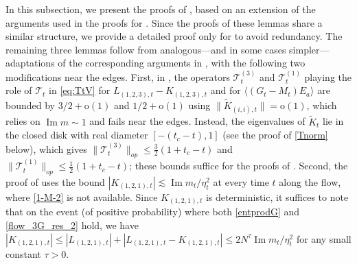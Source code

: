 \documentclass[10pt,reqno]{amsart}
\numberwithin{equation}{section}
\numberwithin{figure}{section}
\theoremstyle{plain} %
\theoremstyle{definition} %
\newcommand{\cal}{\mathcal}
\newcommand{\wt}{\widetilde}
\DeclareMathOperator{\im}{\mathrm{Im}}
\newcommand{\oo}{\mathrm{o}}
\numberwithin{equation}{section}
\begin{document}
In this subsection, we present the proofs of , based on an extension of the arguments used in the proofs for \cite[Lemmas 4.6--4.9]{stone2024randommatrixmodelquantum}.
Since the proofs of these lemmas share a similar structure, we provide a detailed proof only for  to avoid redundancy. The remaining three lemmas follow from analogous---and in some cases simpler---adaptations of the corresponding arguments in \cite{stone2024randommatrixmodelquantum}, with the following two modifications near the edges. 
First, in \cite[Lemmas 4.7 and 4.8]{stone2024randommatrixmodelquantum}, the operators $\cal T^{(3)}_t$ and $\cal T^{(1)}_t$ playing the role of $\cal T_t$ in \eqref{eq:TtV} for $L_{(1,2,3),t}-K_{(1,2,3),t}$ and for $\langle(G_t-M_t)E_a\rangle$ are bounded by $3/2+\oo(1)$ and $1/2+\oo(1)$ using $\|\wt K_{(i,i),t}\|=\oo(1)$, which relies on $\im m\sim 1$ and fails near the edges. Instead, the eigenvalues of $\wt K_{t}$ lie in the closed disk with real diameter $[-(t_c-t),1]$ (see the proof of \eqref{Tnorm} below), which gives $\|\cal T^{(3)}_t\|_{op}\le \frac32(1+t_c-t)$ and $\|\cal T^{(1)}_t\|_{op}\le \frac12(1+t_c-t)$; these bounds suffice for the proofs of . 
Second, the proof of  uses the bound $|K_{(1,2,1),t}|\lesssim \im m_t/\eta_t^2$ at every time $t$ along the flow, where \eqref{1-M-2} is not available. Since $K_{(1,2,1),t}$ is deterministic, it suffices to note that on the event (of positive probability) where both \eqref{entprodG} and \eqref{flow_3G_res_2} hold, we have $|K_{(1,2,1),t}|\le |L_{(1,2,1),t}|+|L_{(1,2,1),t}-K_{(1,2,1),t}|\le 2N^{\tau}\im m_t/\eta_t^2$ for any small constant $\tau>0$.
\end{document}
